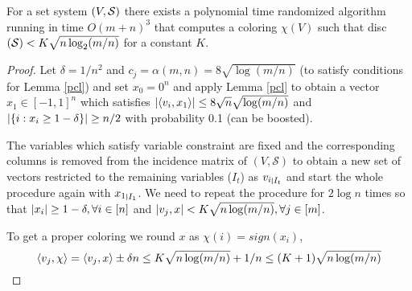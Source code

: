 \begin{theorem}
For a set system $\left(V,\mathcal{S} \right )$ there exists a polynomial time randomized algorithm running in time $O(m+n)^3$ that computes a coloring $\chi(V)$ such that disc$\left(\mathcal{S} \right ) < K\sqrt{n\log_2(m/n)}$ for a constant $K$.
\end{theorem}
\begin{proof}
Let $\delta = 1/n^2$ and $c_j = \alpha(m,n) = 8 \sqrt{\log(m/n)}$ (to satisfy conditions for Lemma \ref{pcl}) and set $x_0 =0^n$ and apply Lemma \ref{pcl} to obtain a vector $x_1 \in [-1,1]^n$ which satisfies 
$\left\lvert \left\langle v_i,x_1\right\rangle \right\rvert \leq 8\sqrt{n}\sqrt{\log(m/n)}$ and $\left\lvert \left\{i : x_i \geq 1 - \delta\right\} \right\rvert \geq n/2$ with probability 0.1 (can be boosted).\par
The variables which satisfy variable constraint are fixed and the corresponding columns is removed from the incidence matrix of $(V,\mathcal{S})$ to obtain a new set of vectors restricted to the remaining variables ($I_t$) as ${v_i}_{\mkern 1mu \vrule height 1ex\mkern2mu {I_t}}$ and start the whole procedure again with ${x_1}_{\mkern 1mu \vrule height 1ex\mkern2mu {I_1}}$.
We need to repeat the procedure for $2\log n$ times so that $\left\lvert x_i \right\rvert \geq 1- \delta, \forall i \in [n]$ and $\left\lvert v_j,x \right\rvert < K\sqrt{n\log(m/n)}, \forall j \in [m]$. 

To get a proper coloring we round $x$ as $\chi(i) = sign(x_i) $,
\[ \left\langle v_j,\chi\right\rangle = \left\langle v_j,x\right\rangle \pm \delta n \leq K\sqrt{n\log(m/n)} + 1/n \leq (K+1)\sqrt{n\log(m/n)} \]
\end{proof}